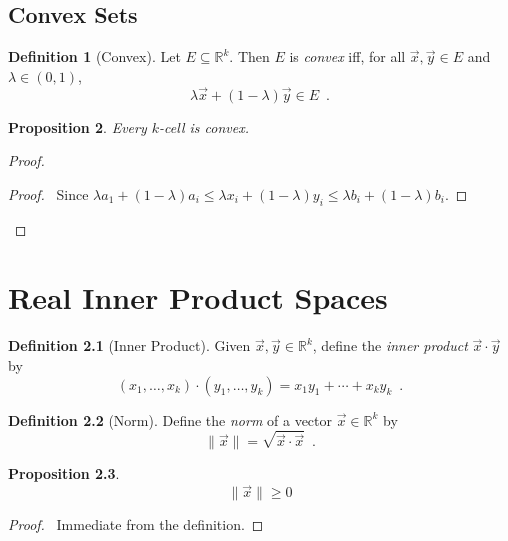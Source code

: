 \documentclass{book}
\let\qed\relax
\newtheorem{prop}{Proposition}[chapter]
\theoremstyle{definition}
\newtheorem{df}[prop]{Definition}
\begin{document}
\section{Convex Sets}

\begin{df}[Convex]
Let $E \subseteq \mathbb{R}^k$. Then $E$ is \emph{convex} iff, for all $\vec{x}, \vec{y} \in E$ and $\lambda \in (0,1)$,
\[ \lambda \vec{x} + (1 - \lambda) \vec{y} \in E \enspace . \]
\end{df}

\begin{prop}
Every $k$-cell is convex.
\end{prop}

\begin{proof}
\pf
{}
\begin{proof}
\pf\ Since $\lambda a_1 + (1-\lambda) a_i \leq \lambda x_i + (1 - \lambda) y_i \leq \lambda b_i + (1 - \lambda) b_i$.
\end{proof}
\qed
\end{proof}

\chapter{Real Inner Product Spaces}

\begin{df}[Inner Product]
Given $\vec{x}, \vec{y} \in \mathbb{R}^k$, define the \emph{inner product} $\vec{x} \cdot \vec{y}$ by
\[ (x_1, \ldots, x_k) \cdot (y_1, \ldots, y_k) = x_1 y_1 + \cdots + x_k y_k \enspace . \]
\end{df}

\begin{df}[Norm]
Define the \emph{norm} of a vector $\vec{x} \in \mathbb{R}^k$ by
\[ \|\vec{x}\| = \sqrt{\vec{x} \cdot \vec{x}} \enspace . \]
\end{df}

\begin{prop}
\[ \|\vec{x}\| \geq 0 \]
\end{prop}

\begin{proof}
\pf\ Immediate from the definition. \qed
\end{proof}
\end{document}

